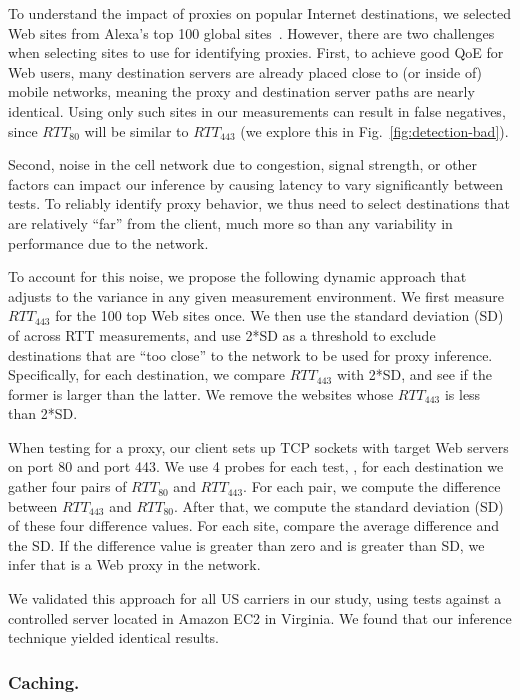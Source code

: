 To understand the impact of proxies on popular Internet destinations, we selected Web sites from Alexa's top 100 global sites~\cite{topweb}. However, there are two challenges when selecting sites to use for identifying proxies. First, to achieve good QoE for Web users, many destination servers are already placed close to (or inside of) mobile networks, meaning the proxy and destination server paths are nearly identical. Using only such sites in our measurements can result in false negatives, since $RTT_{80}$ will be similar to $RTT_{443}$ (we explore this in Fig.~\ref{fig:detection-bad}). 

Second, noise in the cell network due to congestion, signal strength, or other factors can impact our inference by causing latency to vary significantly between tests. To reliably identify proxy behavior, we thus need to select destinations that are relatively ``far'' from the client, much more so than any variability in performance due to the network. 

To account for this noise, we propose the following dynamic approach that adjusts to the variance in any given measurement environment. We first measure   $RTT_{443}$ for the 100 top Web sites once. We then use the standard deviation (SD) of across RTT measurements, and use 2*SD as a threshold to exclude destinations that are ``too close'' to the network to be used for proxy inference. Specifically, for each destination, we compare $RTT_{443}$ with 2*SD, and see if the former is larger than the latter. We remove the websites whose $RTT_{443}$ is less than 2*SD.

When testing for a proxy, our client sets up TCP sockets with target Web servers on port 80 and port 443.  We use 4 probes for each test, \ie, for each destination we gather four pairs of $RTT_{80}$ and $RTT_{443}$. For each pair, we compute the difference between $RTT_{443}$ and $RTT_{80}$. After that, we compute the standard deviation (SD) of these four difference values. For each site, compare the average difference and the SD. If the difference value is greater than zero and is greater than SD, we infer that is a Web proxy in the network. 

We validated this approach for all US carriers in our study, using tests against a controlled server located in Amazon EC2 in Virginia. We found that our inference technique yielded identical results.

\vspace{-1em}
\subsubsection{Caching.}

